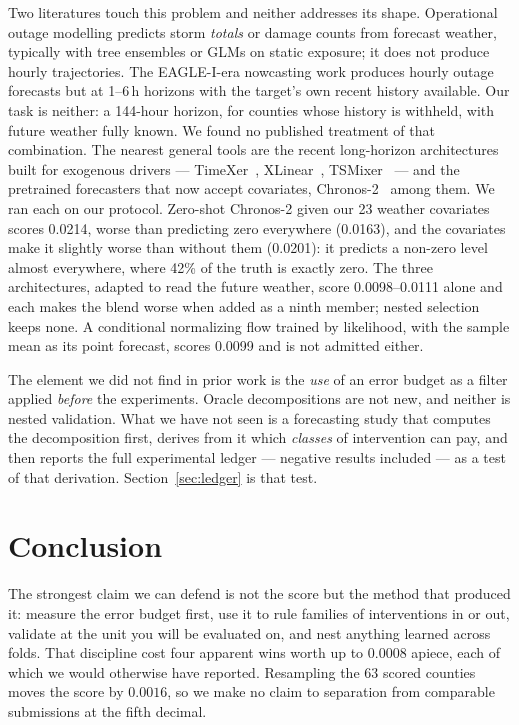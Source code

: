 \documentclass[10pt,letterpaper,twocolumn]{article}
\begin{document}
Two literatures touch this problem and neither addresses its shape. Operational
outage modelling predicts storm \emph{totals} or damage counts from forecast
weather, typically with tree ensembles or GLMs on static exposure; it does not
produce hourly trajectories. The EAGLE-I-era nowcasting work produces hourly
outage forecasts but at 1--6\,h horizons with the target's own recent history
available. Our task is neither: a 144-hour horizon, for counties whose history is
withheld, with future weather fully known. We found no published treatment of
that combination. The nearest general tools are the recent long-horizon
architectures built for exogenous drivers --- TimeXer~\cite{timexer},
XLinear~\cite{xlinear}, TSMixer~\cite{tsmixer} --- and the pretrained
forecasters that now accept covariates, Chronos-2~\cite{chronos2} among them.
We ran each on our protocol. Zero-shot Chronos-2 given our 23 weather
covariates scores 0.0214, worse than predicting zero everywhere (0.0163), and
the covariates make it slightly worse than without them (0.0201): it predicts a
non-zero level almost everywhere, where 42\% of the truth is exactly zero. The
three architectures, adapted to read the future weather, score
0.0098--0.0111 alone
and each makes the blend worse when added as a ninth member; nested selection
keeps none. A conditional normalizing flow trained by likelihood, with the
sample mean as its point forecast, scores 0.0099 and is not admitted either.

The element we did not find in prior work is the \emph{use} of an error budget
as a filter applied \emph{before} the experiments. Oracle decompositions are
not new, and neither is
nested validation. What we have not seen is a forecasting study that computes
the decomposition first, derives from it which \emph{classes} of intervention can
pay, and then reports the full experimental ledger --- negative results
included --- as a test of that derivation. Section~\ref{sec:ledger} is that
test.

\section{Conclusion}

The strongest claim we can defend is not the score but the method that produced
it: measure the error budget first, use it to rule families of interventions in
or out, validate at the unit you will be evaluated on, and nest anything learned
across folds. That discipline cost four apparent wins worth up to $0.0008$
apiece, each of which we would otherwise have reported. Resampling the 63 scored
counties moves the score by $0.0016$, so we make no claim to separation from
comparable submissions at the fifth decimal.
\end{document}
